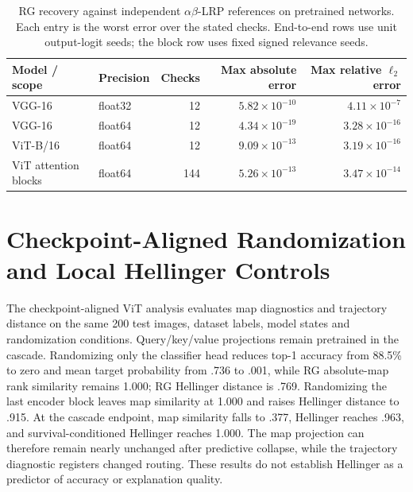 \begin{changed}
\begin{table}[!ht]
\centering\small
\begin{tabular}{llrrr}
\toprule
Model / scope & Precision & Checks & Max absolute error & Max relative $\ell_2$ error \\
\midrule
VGG-16 & float32 & 12 & $5.82\times10^{-10}$ & $4.11\times10^{-7}$ \\
VGG-16 & float64 & 12 & $4.34\times10^{-19}$ & $3.28\times10^{-16}$ \\
ViT-B/16 & float64 & 12 & $9.09\times10^{-13}$ & $3.19\times10^{-16}$ \\
ViT attention blocks & float64 & 144 & $5.26\times10^{-13}$ & $3.47\times10^{-14}$ \\
\bottomrule
\end{tabular}
\caption[RG recovery against independent references]{RG recovery against independent $\alpha\beta$-LRP references on pretrained networks. Each entry is the worst error over the stated checks. End-to-end rows use unit output-logit seeds; the block row uses fixed signed relevance seeds.}
\label{tab:rebuttal-rg-recovery}
\end{table}
\end{changed}

\section{Checkpoint-Aligned Randomization and Local Hellinger Controls}\label{app:rebuttal-randomization}

The checkpoint-aligned ViT analysis evaluates map diagnostics and trajectory distance on the same 200 test images, dataset labels, model states and randomization conditions. Query/key/value projections remain pretrained in the cascade. Randomizing only the classifier head reduces top-1 accuracy from 88.5\% to zero and mean target probability from .736 to .001, while RG absolute-map rank similarity remains 1.000; RG Hellinger distance is .769. Randomizing the last encoder block leaves map similarity at 1.000 and raises Hellinger distance to .915. At the cascade endpoint, map similarity falls to .377, Hellinger reaches .963, and survival-conditioned Hellinger reaches 1.000. The map projection can therefore remain nearly unchanged after predictive collapse, while the trajectory diagnostic registers changed routing. These results do not establish Hellinger as a predictor of accuracy or explanation quality.

